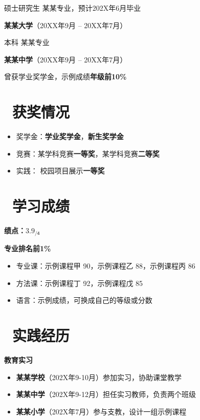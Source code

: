 \documentclass[11pt]{article}
\begin{document}
\qquad 硕士研究生 \quad 某某专业，预计202X年6月毕业

\textbf{某某大学}（20XX年9月 -- 20XX年7月）

\qquad 本科 \quad 某某专业

\textbf{某某中学}（20XX年9月 -- 20XX年7月）

\qquad 曾获学业奖学金，示例成绩\textbf{年级前10\%}

\section{\makebox[\widthof{\faGraduationCap}][c]{\color{CVBlue}\faTrophy}\ 获奖情况}
\begin{itemize}
	\item 奖学金：\textbf{学业奖学金}，\textbf{新生奖学金}
	\item 竞赛：某学科竞赛\textbf{一等奖}，某学科竞赛\textbf{二等奖}
	\item 实践： 校园项目展示\textbf{一等奖}
\end{itemize}


\section{\makebox[\widthof{\faGraduationCap}][c]{\color{CVBlue}\faFileText}\ 学习成绩}
\textbf{绩点：$\mathsf{3.9_{/4}}$} \

\textbf{专业排名前1\%}
\begin{itemize}[parsep=0.5ex]
	\item 专业课：示例课程甲 90，示例课程乙 88，示例课程丙 86
	\item 方法课：示例课程丁 92，示例课程戊 85
	\item 语言：示例成绩，可换成自己的等级或分数
\end{itemize}


\section{\makebox[\widthof{\faGraduationCap}][c]{\color{CVBlue}\faUniversity}\ 实践经历}
\textbf{教育实习}
\begin{itemize}
	\item \textbf{某某学校}（202X年9-10月）参加实习，协助课堂教学
	\item \textbf{某某中学}（202X年9-12月）担任实习教师，负责两个班级
	\item \textbf{某某小学}（202X年7月）参与支教，设计一组示例课程
\end{itemize}
\end{document}
